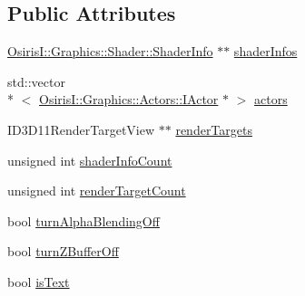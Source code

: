 \subsection*{Public Attributes}
\begin{DoxyCompactItemize}
\item 
\hyperlink{struct_osiris_i_1_1_graphics_1_1_shader_1_1_shader_info}{Osiris\-I\-::\-Graphics\-::\-Shader\-::\-Shader\-Info} $\ast$$\ast$ \hyperlink{struct_osiris_i_1_1_graphics_1_1_renderer_1_1_render_info_a04b11c643c4a8891be351b4409749ef4}{shader\-Infos}
\item 
std\-::vector\\*
$<$ \hyperlink{class_osiris_i_1_1_graphics_1_1_actors_1_1_i_actor}{Osiris\-I\-::\-Graphics\-::\-Actors\-::\-I\-Actor} $\ast$ $>$ \hyperlink{struct_osiris_i_1_1_graphics_1_1_renderer_1_1_render_info_aa4e8a7cd019112f24509eb8479449c68}{actors}
\item 
I\-D3\-D11\-Render\-Target\-View $\ast$$\ast$ \hyperlink{struct_osiris_i_1_1_graphics_1_1_renderer_1_1_render_info_a93c6fc5f468bf5f6e514985385d133b2}{render\-Targets}
\item 
unsigned int \hyperlink{struct_osiris_i_1_1_graphics_1_1_renderer_1_1_render_info_a5fea17ef0b8bc9a588728915005851a0}{shader\-Info\-Count}
\item 
unsigned int \hyperlink{struct_osiris_i_1_1_graphics_1_1_renderer_1_1_render_info_af7e7f97ccae9502ab5472d4c66352e13}{render\-Target\-Count}
\item 
bool \hyperlink{struct_osiris_i_1_1_graphics_1_1_renderer_1_1_render_info_a38350ac9944d66852a8599ac11e1e20f}{turn\-Alpha\-Blending\-Off}
\item 
bool \hyperlink{struct_osiris_i_1_1_graphics_1_1_renderer_1_1_render_info_a0ccb6a5b0daa7610dd1848b5e073b871}{turn\-Z\-Buffer\-Off}
\item 
bool \hyperlink{struct_osiris_i_1_1_graphics_1_1_renderer_1_1_render_info_a681d2cb31ae2107220c3647c95985b30}{is\-Text}
\end{DoxyCompactItemize}


